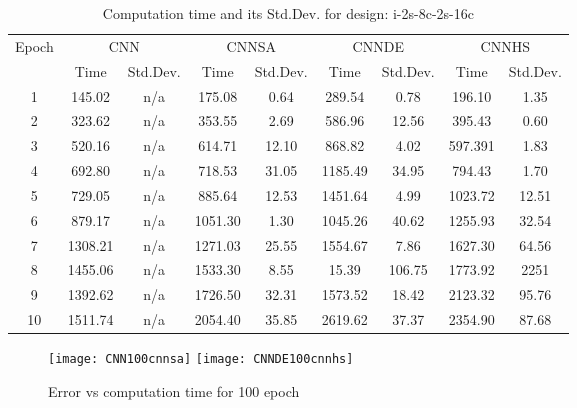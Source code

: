 \documentclass[10pt,letterpaper]{article}
\begin{document}
\begin{table}[]
\small
\caption{Computation time and its Std.Dev. for design: i-2s-8c-2s-16c}
\label{tab:my_label}

\begin{tabular}{c c c c c c c c c}
\hline
\multicolumn{1}{c}{\multirow{2}{*}{Epoch}} & \multicolumn{2}{c}{CNN} &
\multicolumn{2}{c}{CNNSA} & \multicolumn{2}{c}{CNNDE} & \multicolumn{2}{c}{CNNHS}\\
\cline{2-9}

\multicolumn{1}{r}{}       & \multicolumn{1}{c}{Time} & \multicolumn{1}{c}{Std.Dev.} &
\multicolumn{1}{c}{Time} & \multicolumn{1}{c}{Std.Dev.}  & \multicolumn{1}{c}{Time} &
\multicolumn{1}{c}{Std.Dev.} & \multicolumn{1}{c}{Time} & \multicolumn{1}{c}{Std.Dev.} \\
\hline

1		& 145.02  & n/a    & 175.08  & 0.64  & 289.54  & 0.78    & 196.10  & 1.35  \\
2 		& 323.62  & n/a    & 353.55  & 2.69  & 586.96  & 12.56   & 395.43  & 0.60  \\
3		& 520.16  & n/a    & 614.71  & 12.10 & 868.82  & 4.02    & 597.391 & 1.83  \\
4		& 692.80  & n/a    & 718.53  & 31.05 & 1185.49 & 34.95   & 794.43  & 1.70  \\
5		& 729.05  & n/a    & 885.64  & 12.53 & 1451.64 & 4.99    & 1023.72 & 12.51 \\
6		& 879.17  & n/a    & 1051.30 & 1.30  & 1045.26 & 40.62   & 1255.93 & 32.54 \\
7 		& 1308.21 & n/a    & 1271.03 & 25.55 & 1554.67 & 7.86    & 1627.30 & 64.56  \\
8		& 1455.06 & n/a    & 1533.30 & 8.55  & 15.39   & 106.75  & 1773.92 & 2251  \\
9		& 1392.62 & n/a    & 1726.50 & 32.31 & 1573.52 & 18.42   & 2123.32 & 95.76  \\
10		& 1511.74 & n/a    & 2054.40 & 35.85 & 2619.62 & 37.37   & 2354.90 & 87.68 \\

\hline
\end{tabular}
\end{table}



\begin{figure}
    \texttt{[image: CNN100cnnsa]}
    \texttt{[image: CNNDE100cnnhs]}
    \caption{Error vs computation time for 100 epoch}
    \label{fig:my_label}
\end{figure}
\end{document}
